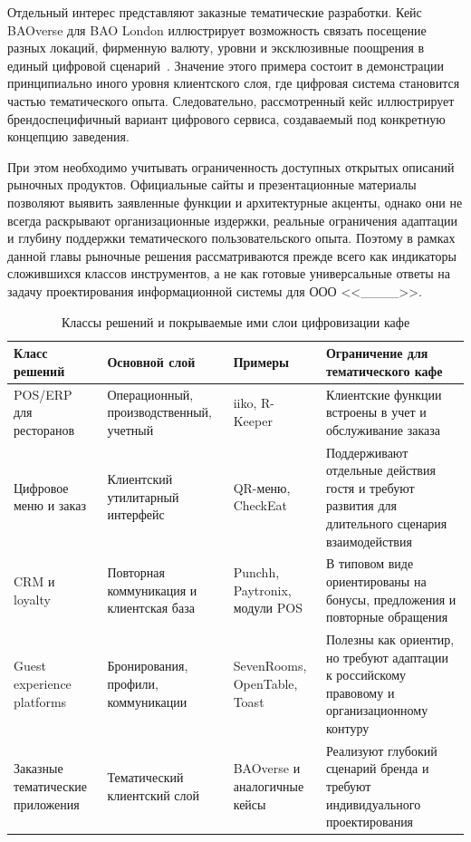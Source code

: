 Отдельный интерес представляют заказные тематические разработки. Кейс BAOverse для BAO London иллюстрирует возможность связать посещение разных локаций, фирменную валюту, уровни и эксклюзивные поощрения в единый цифровой сценарий~\cite{baoverse2026}. Значение этого примера состоит в демонстрации принципиально иного уровня клиентского слоя, где цифровая система становится частью тематического опыта. Следовательно, рассмотренный кейс иллюстрирует брендоспецифичный вариант цифрового сервиса, создаваемый под конкретную концепцию заведения.

При этом необходимо учитывать ограниченность доступных открытых описаний рыночных продуктов. Официальные сайты и презентационные материалы позволяют выявить заявленные функции и архитектурные акценты, однако они не всегда раскрывают организационные издержки, реальные ограничения адаптации и глубину поддержки тематического пользовательского опыта. Поэтому в рамках данной главы рыночные решения рассматриваются прежде всего как индикаторы сложившихся классов инструментов, а не как готовые универсальные ответы на задачу проектирования информационной системы для ООО <<\_\_\_\_>>.

\begin{table}[H]
\centering
\small
\caption{Классы решений и покрываемые ими слои цифровизации кафе}
\label{tab:solution_classes}
\begin{tabularx}{\textwidth}{|>{\raggedright\arraybackslash}p{}|>{\raggedright\arraybackslash}p{}|>{\raggedright\arraybackslash}p{}|>{\raggedright\arraybackslash}X|}
\hline
\textbf{Класс решений} & \textbf{Основной слой} & \textbf{Примеры} & \textbf{Ограничение для тематического кафе} \\ \hline
POS/ERP для ресторанов & Операционный, производственный, учетный & iiko, R-Keeper & Клиентские функции встроены в учет и обслуживание заказа \\ \hline
Цифровое меню и заказ & Клиентский утилитарный интерфейс & QR-меню, CheckEat & Поддерживают отдельные действия гостя и требуют развития для длительного сценария взаимодействия \\ \hline
CRM и loyalty & Повторная коммуникация и клиентская база & Punchh, Paytronix, модули POS & В типовом виде ориентированы на бонусы, предложения и повторные обращения \\ \hline
Guest experience platforms & Бронирования, профили, коммуникации & SevenRooms, OpenTable, Toast & Полезны как ориентир, но требуют адаптации к российскому правовому и организационному контуру \\ \hline
Заказные тематические приложения & Тематический клиентский слой & BAOverse и аналогичные кейсы & Реализуют глубокий сценарий бренда и требуют индивидуального проектирования \\ \hline
\end{tabularx}
\normalsize
\end{table}


